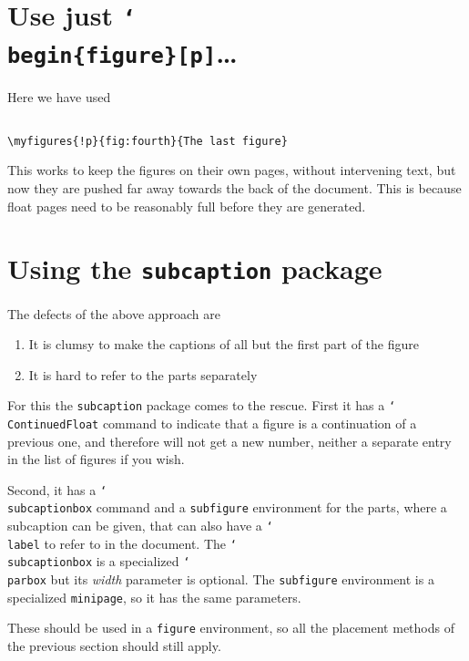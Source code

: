 \documentclass{article}
\newcommand{\cs}[1]{\texttt{\char`\\#1}}
\begin{document}
\medskip 

\lipsum[1-2]

\section{Use  just  \cs{begin}\texttt{\{figure\}[p]}\ldots}

\begin{boxedminipage}{\textwidth}
Here we have used
\begin{verbatim}

\myfigures{!p}{fig:fourth}{The last figure}

\end{verbatim}
This works to keep the figures on their own pages, without intervening
text, but now they are pushed far away towards the back of the document. This
is because float pages need to be reasonably full before they are
generated.
\end{boxedminipage}



\clearpage

\section{Using the \texttt{subcaption} package}
\label{sec:suncaption}

The defects of the above approach are
\begin{enumerate}
\item It is clumsy to make the captions of all but the first part of the figure
\item It is hard to refer to the parts separately
\end{enumerate}
For this the \texttt{subcaption} package comes to the rescue. First it has a \cs{ContinuedFloat} command to indicate that a figure is a continuation of a previous one, and therefore will not get a new number, neither a separate entry in the list of figures if you wish.

Second, it has a \cs{subcaptionbox} command and a \texttt{subfigure} environment for the parts, where a subcaption can be given, that can also have a \cs{label} to refer to in the document. The \cs{subcaptionbox} is a specialized \cs{parbox} but its \emph{width} parameter is optional. The \texttt{subfigure} environment is a specialized \texttt{minipage}, so it has the same parameters.

These should be used in a \texttt{figure} environment, so all the placement methods of the previous section should still apply.
\end{document}
